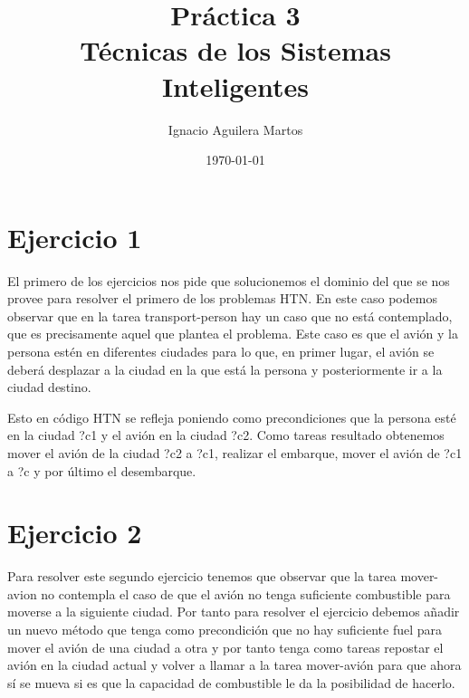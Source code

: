 \documentclass[12pt,a4paper]{article}
\author{Ignacio Aguilera Martos}
\title{Práctica 3 \\ Técnicas de los Sistemas Inteligentes}
\date{\today}
\begin{document}
	\maketitle

	\tableofcontents

	\newpage

\section{Ejercicio 1}

El primero de los ejercicios nos pide que solucionemos el dominio del que se nos provee para resolver el primero de los problemas HTN. En este caso podemos observar que en la tarea transport-person hay un caso que no está contemplado, que es precisamente aquel que plantea el problema. Este caso es que el avión y la persona estén en diferentes ciudades para lo que, en primer lugar, el avión se deberá desplazar a la ciudad en la que está la persona y posteriormente ir a la ciudad destino.

Esto en código HTN se refleja poniendo como precondiciones que la persona esté en la ciudad ?c1 y el avión en la ciudad ?c2. Como tareas resultado obtenemos mover el avión de la ciudad ?c2 a ?c1, realizar el embarque, mover el avión de ?c1 a ?c y por último el desembarque.

\section{Ejercicio 2}

Para resolver este segundo ejercicio tenemos que observar que la tarea mover-avion no contempla el caso de que el avión no tenga suficiente combustible para moverse a la siguiente ciudad. Por tanto para resolver el ejercicio debemos añadir un nuevo método que tenga como precondición que no hay suficiente fuel para mover el avión de una ciudad a otra y por tanto tenga como tareas repostar el avión en la ciudad actual y volver a llamar a la tarea mover-avión para que ahora sí se mueva si es que la capacidad de combustible le da la posibilidad de hacerlo.
\end{document}
